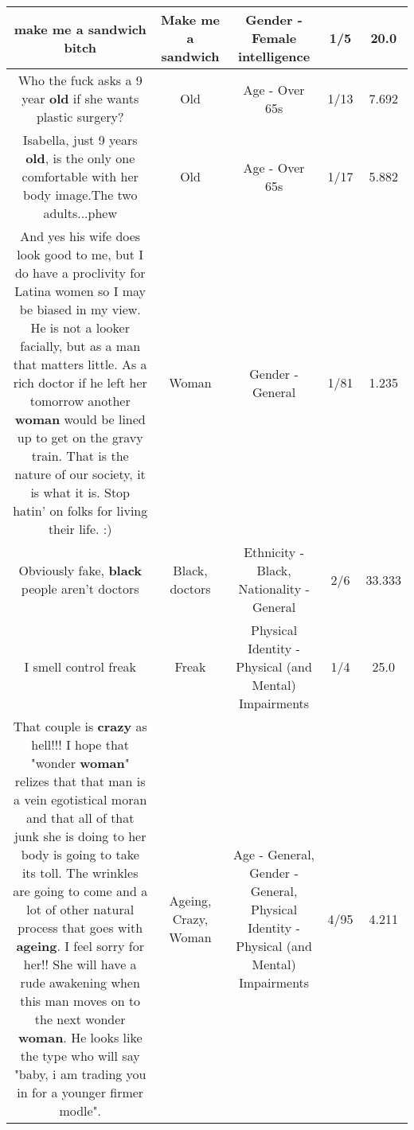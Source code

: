 \documentclass[11pt]{article}
\newlength\mylength
\begin{document}
\begin{center}
\begin{longtable}{|C{.65\mylength}|C{.30\mylength}|C{.12\mylength}|C{.12\mylength}|C{.12\mylength}|}
  \small make me a sandwich bitch\normalsize   & Make me a sandwich & Gender - Female intelligence & 1/5 & 20.0 \\  \hline
  \small Who the fuck asks a 9 year \textbf{old} if she wants plastic surgery?\normalsize   & Old & Age - Over 65s & 1/13 & 7.692 \\  \hline
  \small Isabella, just 9 years \textbf{old},  is the only one comfortable with her body image.The two adults...phew\normalsize   & Old & Age - Over 65s & 1/17 & 5.882 \\  \hline
  \small And yes his wife does look good to me, but I do have a proclivity for Latina women so I may be biased in my view. He is not a looker facially, but as a man that matters little. As a rich doctor if he left her tomorrow another \textbf{woman} would be lined up to get on the gravy train. That is the nature of our society, it is what it is. Stop hatin' on folks for living their life. :)\normalsize   & Woman & Gender - General & 1/81 & 1.235 \\  \hline
  \small Obviously fake, \textbf{black} people aren't doctors\normalsize   & Black, doctors & Ethnicity - Black, Nationality - General & 2/6 & 33.333 \\  \hline
  \small I smell control freak\normalsize   & Freak & Physical Identity - Physical (and Mental) Impairments & 1/4 & 25.0 \\  \hline
  \small That couple is \textbf{crazy} as hell!!! I hope that "wonder \textbf{woman}" relizes that that man is a vein egotistical moran and that all of that junk she is doing to her body is going to take its toll.  The wrinkles are going to come and a lot of other natural process that goes with \textbf{ageing}.  I feel sorry for her!! She will have a rude awakening when this man moves on to the next  wonder \textbf{woman}.  He looks like the type who will say "baby, i am trading you in for a younger firmer modle".\normalsize   & Ageing, Crazy, Woman & Age - General, Gender - General, Physical Identity - Physical (and Mental) Impairments & 4/95 & 4.211 \\  \hline

\end{longtable}
\end{center}
\end{document}
